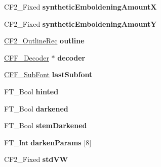 \begin{DoxyCompactItemize}
\item 
\mbox{\label{struct_c_f2___font_rec___acc4d7f71eb418d024965c276f986ab0a}} 
C\+F2\+\_\+\+Fixed {\bfseries synthetic\+Emboldening\+AmountX}
\item 
\mbox{\label{struct_c_f2___font_rec___a8cc6ae4a09571c74c7798e61441e2e88}} 
C\+F2\+\_\+\+Fixed {\bfseries synthetic\+Emboldening\+AmountY}
\item 
\mbox{\label{struct_c_f2___font_rec___a93bf907cfd7193d5bc34fe3c1974735d}} 
\hyperlink{struct_c_f2___outline_rec__}{C\+F2\+\_\+\+Outline\+Rec} {\bfseries outline}
\item 
\mbox{\label{struct_c_f2___font_rec___a28a6d942bedbffc6625036d38d8a4076}} 
\hyperlink{struct_c_f_f___decoder__}{C\+F\+F\+\_\+\+Decoder} $\ast$ {\bfseries decoder}
\item 
\mbox{\label{struct_c_f2___font_rec___ad255d134a21eff55259a820d7cb3fb3b}} 
\hyperlink{struct_c_f_f___sub_font_rec__}{C\+F\+F\+\_\+\+Sub\+Font} {\bfseries last\+Subfont}
\item 
\mbox{\label{struct_c_f2___font_rec___a5350e8bcab14d7272b47c4ff28b4df45}} 
F\+T\+\_\+\+Bool {\bfseries hinted}
\item 
\mbox{\label{struct_c_f2___font_rec___a62a08410c45ea764289db9ac0a44fb7a}} 
F\+T\+\_\+\+Bool {\bfseries darkened}
\item 
\mbox{\label{struct_c_f2___font_rec___a38c3cfa600be7d8c35b25a1621f231c7}} 
F\+T\+\_\+\+Bool {\bfseries stem\+Darkened}
\item 
\mbox{\label{struct_c_f2___font_rec___a094f67081a57eb766aa9aec3c66365b4}} 
F\+T\+\_\+\+Int {\bfseries darken\+Params} \mbox{[}8\mbox{]}
\item 
\mbox{\label{struct_c_f2___font_rec___a81a93428fb0db026cf049535fedd12e7}} 
C\+F2\+\_\+\+Fixed {\bfseries std\+VW}
\item 

\end{DoxyCompactItemize}
